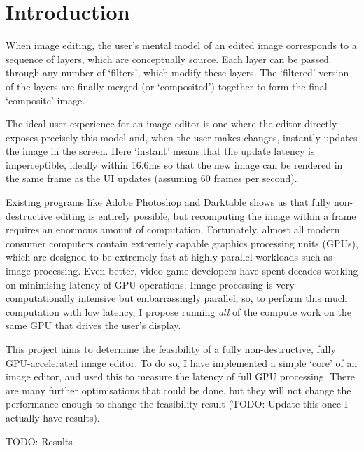 \documentclass[12pt]{article}
\begin{document}
\pagebreak

\tableofcontents



\pagebreak

\section{Introduction}

When image editing, the user's mental model of an edited image corresponds to a sequence of layers,
which are conceptually source.  Each layer can be passed through any number of `filters', which
modify these layers.  The `filtered' version of the layers are finally merged (or `composited')
together to form the final `composite' image.

The ideal user experience for an image editor is one where the editor directly exposes precisely
this model and, when the user makes changes, instantly updates the image in the screen.  Here
`instant' means that the update latency is imperceptible, ideally within 16.6ms so that the new
image can be rendered in the same frame as the UI updates (assuming 60 frames per second).

Existing programs like Adobe Photoshop and Darktable shows us that fully non-destructive editing is
entirely possible, but recomputing the image within a frame requires an enormous amount of
computation.  Fortunately, almost all modern consumer computers contain extremely capable graphics
processing units (GPUs), which are designed to be extremely fast at highly parallel workloads such
as image processing.  Even better, video game developers have spent decades working on minimising
latency of GPU operations.  Image processing is very computationally intensive but embarrassingly
parallel, so, to perform this much computation with low latency, I propose running \emph{all} of the
compute work on the same GPU that drives the user's display.

This project aims to determine the feasibility of a fully non-destructive, fully GPU-accelerated
image editor.  To do so, I have implemented a simple `core' of an image editor, and used this to
measure the latency of full GPU processing.  There are many further optimisations that could be
done, but they will not change the performance enough to change the feasibility result (TODO: Update
this once I actually have results).

TODO: Results



\pagebreak
\end{document}
